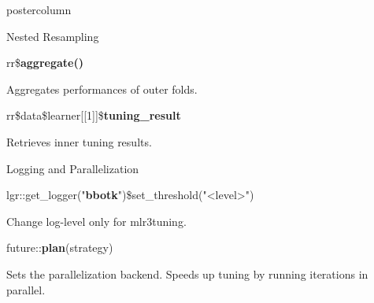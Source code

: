 \documentclass{beamer}
\begin{document}
\begin{frame}[fragile]{}
\begin{columns}
\begin{column}{.245\textwidth}
\begin{beamercolorbox}[center]{postercolumn}
\begin{minipage}{.98\textwidth}
{\begin{myblock}{Nested Resampling}
\begin{codebox}
								rr\$\textbf{aggregate()}
							\end{codebox}
							Aggregates performances of outer folds.
							\\
							\begin{codebox}
								rr\$data\$learner[[1]]\$\textbf{tuning\_result}
							\end{codebox}
							Retrieves inner tuning results.
							\vspace{-0.5em}
						\end{myblock}
						\begin{myblock}{Logging and Parallelization}
							\begin{codebox}
								{\scriptsize
									lgr::get\_logger("\textbf{bbotk}")\$set\_threshold("<level>")}
							\end{codebox}
							Change log-level only for mlr3tuning.\\
							\begin{codebox}
								future::\textbf{plan}(strategy)
							\end{codebox}
							Sets the parallelization backend.
							Speeds up tuning by running iterations in parallel.
						\end{myblock}
						\vfill}
				\end{minipage}
			\end{beamercolorbox}
		\end{column}
	\end{columns}
\end{frame}
\end{document}
